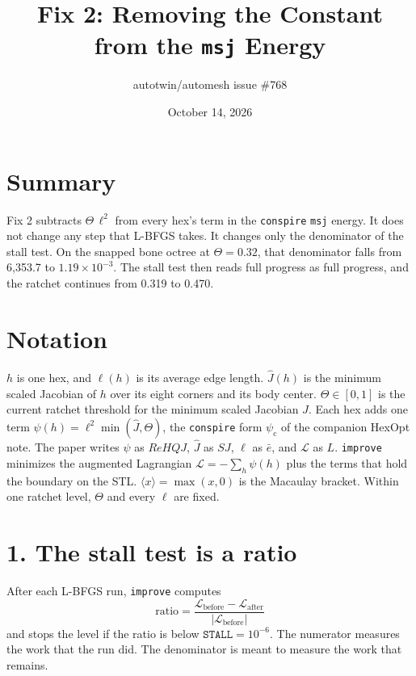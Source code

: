 \documentclass[11pt]{article}
\title{Fix 2: Removing the Constant from the \texttt{msj} Energy}
\author{autotwin/automesh issue \#768}
\date{October 14, 2026}
\newcommand{\Jh}{\hat{J}}
\begin{document}
\maketitle

\section*{Summary}

Fix 2 subtracts $\Theta\,\ell^2$ from every hex's term in the \texttt{conspire} \texttt{msj} energy.
It does not change any step that L-BFGS takes.
It changes only the denominator of the stall test.
On the snapped bone octree at $\Theta = 0.32$, that denominator falls from 6,353.7 to $1.19 \times 10^{-3}$.
The stall test then reads full progress as full progress, and the ratchet continues from 0.319 to 0.470.

\section*{Notation}

$h$ is one hex, and $\ell(h)$ is its average edge length.
$\Jh(h)$ is the minimum scaled Jacobian of $h$ over its eight corners and its body center.
$\Theta \in [0, 1]$ is the current ratchet threshold for the minimum scaled Jacobian $\Jh$.
Each hex adds one term $\psi(h) = \ell^2 \min(\Jh, \Theta)$, the \texttt{conspire} form $\psi_{\mathrm{c}}$ of the companion HexOpt note.
The paper writes $\psi$ as $\mathit{ReHQJ}$, $\Jh$ as $\mathit{SJ}$, $\ell$ as $\bar{e}$, and $\mathcal{L}$ as $L$.
\texttt{improve} minimizes the augmented Lagrangian $\mathcal{L} = -\sum_h \psi(h)$ plus the terms that hold the boundary on the STL.
$\langle x \rangle = \max(x, 0)$ is the Macaulay bracket.
Within one ratchet level, $\Theta$ and every $\ell$ are fixed.

\section*{1. The stall test is a ratio}

After each L-BFGS run, \texttt{improve} computes
\begin{equation}
  \text{ratio} = \frac{\mathcal{L}_{\text{before}} - \mathcal{L}_{\text{after}}}{|\mathcal{L}_{\text{before}}|}
\end{equation}
and stops the level if the ratio is below $\texttt{STALL} = 10^{-6}$.
The numerator measures the work that the run did.
The denominator is meant to measure the work that remains.
\end{document}
